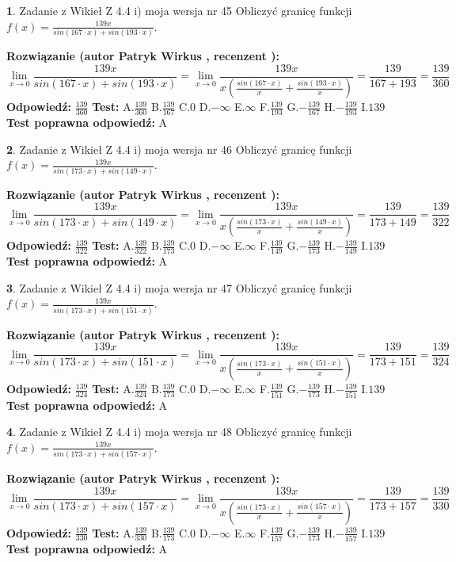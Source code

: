 \documentclass[12pt, a4paper]{article}
\theoremstyle{definition} %
\newtheorem{zad}{}
\newcommand{\zadStart}[1]{\begin{zad}#1\newline}
\newcommand{\zadStop}{\end{zad}}
\newcommand{\rozwStart}[2]{\noindent \textbf{Rozwiązanie (autor #1 , recenzent #2): }\newline}
\newcommand{\rozwStop}{\newline}
\newcommand{\odpStart}{\noindent \textbf{Odpowiedź:}\newline}
\newcommand{\odpStop}{\newline}
\newcommand{\testStart}{\noindent \textbf{Test:}\newline}
\newcommand{\testStop}{\newline}
\newcommand{\kluczStart}{\noindent \textbf{Test poprawna odpowiedź:}\newline}
\newcommand{\kluczStop}{\newline}
\begin{document}
\zadStart{Zadanie z Wikieł Z 4.4 i) moja wersja nr 45}
Obliczyć granicę funkcji $f(x)=\frac{139x}{sin(167\cdot x) +sin(193\cdot x)}$.
\zadStop
\rozwStart{Patryk Wirkus}{}
$$\lim\limits_{x\to 0}\frac{139x}{sin(167\cdot x) +sin(193\cdot x)}=\lim\limits_{x\to 0}\frac{139x}{x(\frac{sin(167\cdot x)}{x}+\frac{sin(193\cdot x)}{x})}=\frac{139}{167+193} = \frac{139}{360}$$
\rozwStop
\odpStart
$\frac{139}{360}$
\odpStop
\testStart
A.$\frac{139}{360}$
B.$\frac{139}{167}$
C.$0$
D.$-\infty$
E.$\infty$
F.$\frac{139}{193}$
G.$-\frac{139}{167}$
H.$-\frac{139}{193}$
I.$139$
\testStop
\kluczStart
A
\kluczStop



\zadStart{Zadanie z Wikieł Z 4.4 i) moja wersja nr 46}
Obliczyć granicę funkcji $f(x)=\frac{139x}{sin(173\cdot x) +sin(149\cdot x)}$.
\zadStop
\rozwStart{Patryk Wirkus}{}
$$\lim\limits_{x\to 0}\frac{139x}{sin(173\cdot x) +sin(149\cdot x)}=\lim\limits_{x\to 0}\frac{139x}{x(\frac{sin(173\cdot x)}{x}+\frac{sin(149\cdot x)}{x})}=\frac{139}{173+149} = \frac{139}{322}$$
\rozwStop
\odpStart
$\frac{139}{322}$
\odpStop
\testStart
A.$\frac{139}{322}$
B.$\frac{139}{173}$
C.$0$
D.$-\infty$
E.$\infty$
F.$\frac{139}{149}$
G.$-\frac{139}{173}$
H.$-\frac{139}{149}$
I.$139$
\testStop
\kluczStart
A
\kluczStop



\zadStart{Zadanie z Wikieł Z 4.4 i) moja wersja nr 47}
Obliczyć granicę funkcji $f(x)=\frac{139x}{sin(173\cdot x) +sin(151\cdot x)}$.
\zadStop
\rozwStart{Patryk Wirkus}{}
$$\lim\limits_{x\to 0}\frac{139x}{sin(173\cdot x) +sin(151\cdot x)}=\lim\limits_{x\to 0}\frac{139x}{x(\frac{sin(173\cdot x)}{x}+\frac{sin(151\cdot x)}{x})}=\frac{139}{173+151} = \frac{139}{324}$$
\rozwStop
\odpStart
$\frac{139}{324}$
\odpStop
\testStart
A.$\frac{139}{324}$
B.$\frac{139}{173}$
C.$0$
D.$-\infty$
E.$\infty$
F.$\frac{139}{151}$
G.$-\frac{139}{173}$
H.$-\frac{139}{151}$
I.$139$
\testStop
\kluczStart
A
\kluczStop



\zadStart{Zadanie z Wikieł Z 4.4 i) moja wersja nr 48}
Obliczyć granicę funkcji $f(x)=\frac{139x}{sin(173\cdot x) +sin(157\cdot x)}$.
\zadStop
\rozwStart{Patryk Wirkus}{}
$$\lim\limits_{x\to 0}\frac{139x}{sin(173\cdot x) +sin(157\cdot x)}=\lim\limits_{x\to 0}\frac{139x}{x(\frac{sin(173\cdot x)}{x}+\frac{sin(157\cdot x)}{x})}=\frac{139}{173+157} = \frac{139}{330}$$
\rozwStop
\odpStart
$\frac{139}{330}$
\odpStop
\testStart
A.$\frac{139}{330}$
B.$\frac{139}{173}$
C.$0$
D.$-\infty$
E.$\infty$
F.$\frac{139}{157}$
G.$-\frac{139}{173}$
H.$-\frac{139}{157}$
I.$139$
\testStop
\kluczStart
A
\kluczStop
\end{document}
